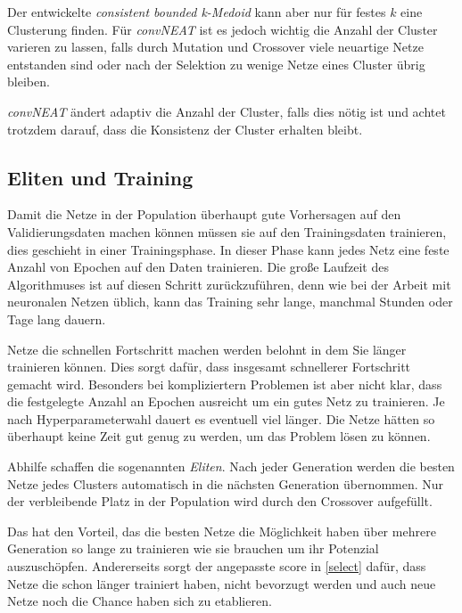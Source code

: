 \documentclass[]{scrartcl}
\begin{document}
				Der entwickelte \textit{consistent bounded k-Medoid} kann aber nur für festes $k$ eine Clusterung finden.
				Für \textit{convNEAT} ist es jedoch wichtig die Anzahl der Cluster varieren zu lassen, falls durch Mutation und Crossover viele
				neuartige Netze entstanden sind oder nach der Selektion zu wenige Netze eines Cluster übrig bleiben.

				\textit{convNEAT} ändert adaptiv die Anzahl der Cluster, falls dies nötig ist und achtet trotzdem darauf, dass die Konsistenz der Cluster erhalten bleibt.



		\subsection{Eliten und Training}
			
			Damit die Netze in der Population überhaupt gute Vorhersagen auf den Validierungsdaten machen können müssen sie auf den Trainingsdaten trainieren, dies geschieht in einer Trainingsphase.
			In dieser Phase kann jedes Netz eine feste Anzahl von Epochen auf den Daten trainieren. Die große Laufzeit des Algorithmuses ist auf diesen Schritt zurückzuführen, denn 
			wie bei der Arbeit mit neuronalen Netzen üblich, kann das Training sehr lange, manchmal Stunden oder Tage lang dauern.

			Netze die schnellen Fortschritt machen werden belohnt in dem Sie länger trainieren können. Dies sorgt dafür, dass insgesamt schnellerer Fortschritt gemacht wird.
			Besonders bei kompliziertern Problemen ist aber nicht klar, dass die festgelegte Anzahl an Epochen ausreicht um ein gutes Netz zu trainieren.
			Je nach Hyperparameterwahl dauert es eventuell viel länger. Die Netze hätten so überhaupt keine Zeit gut genug zu werden, um das Problem lösen zu können.

			Abhilfe schaffen die sogenannten \textit{Eliten}. Nach jeder Generation werden die besten Netze jedes Clusters automatisch in die nächsten Generation übernommen.
			Nur der verbleibende Platz in der Population wird durch den Crossover aufgefüllt.

			Das hat den Vorteil, das die besten Netze die Möglichkeit haben über mehrere Generation so lange zu trainieren wie sie brauchen um ihr Potenzial auszuschöpfen.
			Andererseits sorgt der angepasste score in \ref{select} dafür, dass Netze die schon länger trainiert haben, nicht bevorzugt werden und auch neue Netze noch die Chance haben
			sich zu etablieren.
	
\end{document}
